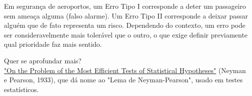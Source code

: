 {\begin{infobox}
Em segurança de aeroportos,
um Erro Tipo I corresponde a deter um passageiro sem ameaça alguma (falso alarme).
Um Erro Tipo II corresponde a deixar passar alguém que de fato representa um risco.
Dependendo do contexto,
um erro pode ser consideravelmente mais tolerável que o outro,
o que exige definir previamente qual prioridade faz mais sentido.
\end{infobox}


\vspace{0.2cm}

{\color{HypePurple2}Quer se aprofundar mais?}\\
\href{https://errorstatistics.com/wp-content/uploads/2014/08/neyman-pearson-1933_on-the-problem-of-the-most-efficient-tests-of-statistical-hypotheses.pdf}{"On the Problem of the Most Efficient Tests of Statistical Hypotheses"}
(Neyman e Pearson, 1933),
que dá nome ao "Lema de Neyman-Pearson",
usado em testes estatísticos.

}